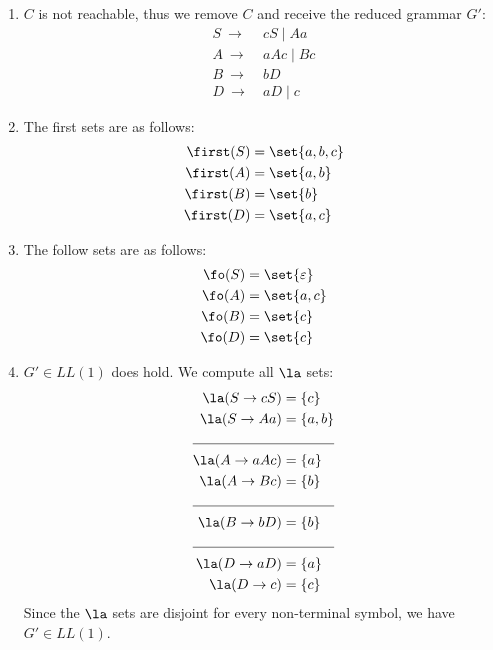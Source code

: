 \begin{solution}
\begin{enumerate}
\item $C$ is not reachable, thus we remove $C$ and receive the reduced grammar $G'$:
    \begin{align*}
        S ~\to~ & c S \mid A a \\
        A ~\to~ & a A c \mid B c \\
        B ~\to~ & b D \\
        D ~\to~ & a D \mid c
    \end{align*}
\item The first sets are as follows:
    \begin{align*}
        \first(S) &= \set{a, b, c} \\
        \first(A) &= \set{a, b} \\
        \first(B) &= \set{b} \\
        \first(D) &= \set{a, c}
    \end{align*}

\item The follow sets are as follows:
\begin{align*}
    \fo(S) &= \set{\varepsilon} \\
    \fo(A) &= \set{a,c} \\
    \fo(B) &= \set{c} \\
    \fo(D) &= \set{c} \\
\end{align*}

\item $G' \in LL(1)$ does hold.
    We compute all $\la$ sets:
    \begin{align*}
        \la(S \rightarrow c S ) &= \{ c \}\\
        \la(S \rightarrow A a ) &= \{ a, b \}\\
        \cline{1-2}
        \la(A \rightarrow a A c ) &= \{ a \}\\
        \la(A \rightarrow B c ) &= \{ b \}\\
        \cline{1-2}
        \la(B \rightarrow b D ) &= \{ b \}\\
        \cline{1-2}
        \la(D \rightarrow a D ) &= \{ a \}\\
        \la(D \rightarrow c ) &= \{ c \}\\
    \end{align*}
    Since the $\la$ sets are disjoint for every non-terminal symbol, we have $G' \in LL(1)$.


\end{enumerate}
\end{solution}
